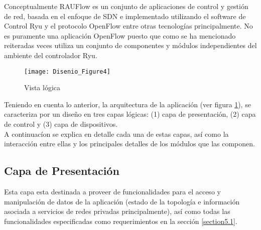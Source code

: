 Conceptualmente RAUFlow es un conjunto de aplicaciones de control y gestión de red, basada en el enfoque de SDN e implementado utilizando el software de Control Ryu y el protocolo OpenFlow entre otras tecnologías principalmente. No es puramente una aplicaci\'on OpenFlow puesto que como se ha mencionado reiteradas veces utiliza un conjunto de componentes y m\'odulos independientes del ambiente del controlador Ryu.




\begin{figure}[h] 
\centering    
\texttt{[image: Disenio\_Figure4]}
\caption[Vista l\'ogica]{Vista l\'ogica}
\label{fig:VistaComponentes2}
\end{figure}

Teniendo en cuenta lo anterior, la arquitectura de la aplicaci\'on (ver figura \ref{fig:VistaComponentes2}), se caracteriza por un diseño en tres capas l\'ogicas: (1) capa de presentaci\'on, (2) capa de control y (3) capa de dispositivos.\\

A continuac\'ion se explica en detalle cada una de estas capas, as\'i como la interacci\'on entre ellas y los principales detalles de los m\'odulos que las componen.

\subsection{Capa de Presentación}
Esta capa esta destinada a proveer de funcionalidades para el acceso y manipulaci\'on de datos de la aplicaci\'on (estado de la topolog\'ia e informaci\'on asociada a servicios de redes privadas principalmente), as\'i como todas las funcionalidades especificadas como requerimientos en la secci\'on 
\ref{section5.1}.\\ 

